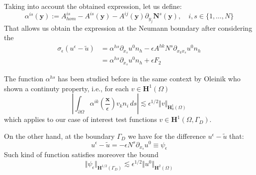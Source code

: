 Taking into account the obtained expression, let us define:
\begin{equation*}
    \alpha^{is}(\mathbf{y}) := A^{is}_{hom} - A^{is}(\mathbf{y}) - A^{ij}(\mathbf{y}) \partial_{y_j} \mathbf{N}^s(\mathbf{y}), \quad i,s \in \{1,\dots, N\}
\end{equation*}
That allows us obtain the expression at the Neumann boundary after considering the 
\begin{equation}
    \label{NeumannExp}
    \begin{aligned}
    \sigma_{\epsilon} (u^{\epsilon}-\tilde{u}) &= \alpha^{hs} \partial_{x_s} u^0 n_h - \epsilon A^{hk}N^s \partial_{x_k x_s} u^0 n_h \\
    & = \alpha^{hs} \partial_{x_s} u^0 n_h + \epsilon F_2
    \end{aligned}
\end{equation}

The function $\alpha^{hs}$ has been studied before in the same context by Oleinik \cite{oleinik1992mathematical} who shown a continuty property, i.e., for each $v \in \mathbf{H}^1(\Omega)$ 
\begin{equation}
    \label{OleinikLemma2.2}
    \left \vert \int_{\partial \Omega} \alpha^{ik}(\frac{\mathbf{x}}{\epsilon}) v_k n_i \,ds \right \vert \lesssim\epsilon^{1/2} \Vert v \Vert_{\mathbf{H}_0^1(\Omega)}
\end{equation}
which applies to our case of interest test functions $v \in \mathbf{H}^1(\Omega, \Gamma_D)$.

On the other hand, at the boundary $\Gamma_D$ we have for the difference $u^{\epsilon} - \tilde{u}$ that:
\begin{equation*}
    u^{\epsilon} - \tilde{u} = - \epsilon N^s \partial_{x_s}u^0 \equiv \psi_{\epsilon}
\end{equation*} 
Such kind of function satisfies moreover the bound
\begin{equation}
    \label{BoundDirichlet}
    \Vert \psi_{\epsilon} \Vert_{\mathbf{H}^{1/2}(\Gamma_D)} \lesssim \epsilon^{1/2} \Vert u^0 \Vert_{\mathbf{H}^2(\Omega)}
\end{equation} 

